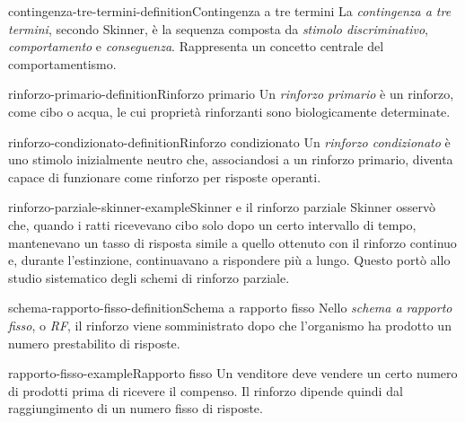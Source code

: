 \documentclass[preview]{standalone}
\begin{document}
\begin{snippetdefinition}{contingenza-tre-termini-definition}{Contingenza a tre termini}
    La \emph{contingenza a tre termini}, secondo Skinner, è la sequenza composta
    da \emph{stimolo discriminativo}, \emph{comportamento} e
    \emph{conseguenza}. Rappresenta un concetto centrale del comportamentismo.
\end{snippetdefinition}


\begin{snippetdefinition}{rinforzo-primario-definition}{Rinforzo primario}
    Un \emph{rinforzo primario} è un rinforzo, come cibo o acqua, le cui
    proprietà rinforzanti sono biologicamente determinate.
\end{snippetdefinition}

\begin{snippetdefinition}{rinforzo-condizionato-definition}{Rinforzo condizionato}
    Un \emph{rinforzo condizionato} è uno stimolo inizialmente neutro che,
    associandosi a un rinforzo primario, diventa capace di funzionare come
    rinforzo per risposte operanti.
\end{snippetdefinition}

\begin{snippetexample}{rinforzo-parziale-skinner-example}{Skinner e il rinforzo parziale}
    Skinner osservò che, quando i ratti ricevevano cibo solo dopo un certo
    intervallo di tempo, mantenevano un tasso di risposta simile a quello
    ottenuto con il rinforzo continuo e, durante l'estinzione, continuavano a
    rispondere più a lungo. Questo portò allo studio sistematico degli schemi di
    rinforzo parziale.
\end{snippetexample}

\begin{snippetdefinition}{schema-rapporto-fisso-definition}{Schema a rapporto fisso}
    Nello \emph{schema a rapporto fisso}, o \emph{RF}, il rinforzo viene
    somministrato dopo che l'organismo ha prodotto un numero prestabilito di
    risposte.
\end{snippetdefinition}

\begin{snippetexample}{rapporto-fisso-example}{Rapporto fisso}
    Un venditore deve vendere un certo numero di prodotti prima di ricevere il
    compenso. Il rinforzo dipende quindi dal raggiungimento di un numero fisso
    di risposte.
\end{snippetexample}
\end{document}
